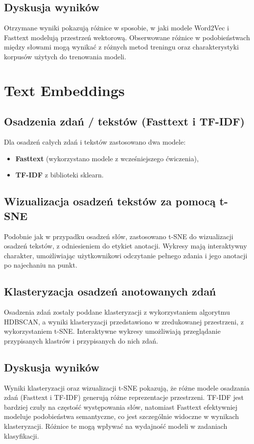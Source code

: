 \documentclass[12pt]{article}
\begin{document}
\subsection{Dyskusja wyników}
Otrzymane wyniki pokazują różnice w sposobie, w jaki modele Word2Vec i Fasttext modelują przestrzeń wektorową. Obserwowane różnice w podobieństwach między słowami mogą wynikać z różnych metod treningu oraz charakterystyki korpusów użytych do trenowania modeli.

\section{Text Embeddings}

\subsection{Osadzenia zdań / tekstów (Fasttext i TF-IDF)}
Dla osadzeń całych zdań i tekstów zastosowano dwa modele:
\begin{itemize}
    \item \textbf{Fasttext} (wykorzystano modele z wcześniejszego ćwiczenia),
    \item \textbf{TF-IDF} z biblioteki sklearn.
\end{itemize}

\subsection{Wizualizacja osadzeń tekstów za pomocą t-SNE}
Podobnie jak w przypadku osadzeń słów, zastosowano t-SNE do wizualizacji osadzeń tekstów, z odniesieniem do etykiet anotacji. Wykresy mają interaktywny charakter, umożliwiając użytkownikowi odczytanie pełnego zdania i jego anotacji po najechaniu na punkt.

\subsection{Klasteryzacja osadzeń anotowanych zdań}
Osadzenia zdań zostały poddane klasteryzacji z wykorzystaniem algorytmu HDBSCAN, a wyniki klasteryzacji przedstawiono w zredukowanej przestrzeni, z wykorzystaniem t-SNE. Interaktywne wykresy umożliwiają przeglądanie przypisanych klastrów i przypisanych do nich zdań.

\subsection{Dyskusja wyników}
Wyniki klasteryzacji oraz wizualizacji t-SNE pokazują, że różne modele osadzania zdań (Fasttext i TF-IDF) generują różne reprezentacje przestrzeni. TF-IDF jest bardziej czuły na częstość występowania słów, natomiast Fasttext efektywniej modeluje podobieństwa semantyczne, co jest szczególnie widoczne w wynikach klasteryzacji. Różnice te mogą wpływać na wydajność modeli w zadaniach klasyfikacji.
\end{document}
